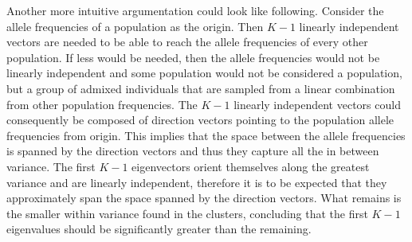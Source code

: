 \documentclass[a4paper, 11pt]{article}
\begin{document}
Another more intuitive argumentation could look like following. Consider the allele frequencies of a population as the origin. Then $K-1$ linearly independent vectors are needed to be able to reach the allele frequencies of every other population. If less would be needed, then the allele frequencies would not be linearly independent and some population would not be considered a population, but a group of admixed individuals that are sampled from a linear combination from other population frequencies. The $K-1$ linearly independent vectors could consequently be composed of direction vectors pointing to the population allele frequencies from origin. This implies that the space between the allele frequencies is spanned by the direction vectors and thus they capture all the in between variance. The first $K-1$ eigenvectors orient themselves along the greatest variance and are linearly independent, therefore it is to be expected that they approximately span the space spanned by the direction vectors. What remains is the smaller within variance found in the clusters, concluding that the first $K-1$ eigenvalues should be significantly greater than the remaining.\\
\end{document}
